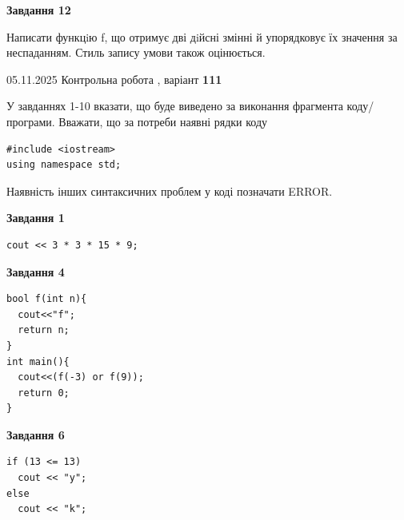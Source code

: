 \documentclass[12pt, ukrainian]{article}
\begin{document}
{\begin {large}
\begin{minipage}[t]{11.0cm}
\begin{center}
\textbf{Завдання 12}
\end{center}

Написати функцiю f, що отримує дві дiйсні змінні й упорядковує їх значення за неспаданням. Стиль запису умови також оцінюється.\par

\end{minipage}

\end {large}}
\newpage

{\Large{05.11.2025 Контрольна робота , варіант  \No \textbf { 111 }\par}}
{
\begin {large}
У завданнях 1-10 вказати, що буде виведено за виконання фрагмента коду/про\-гра\-ми.
Вважати, що за потреби наявні рядки коду
\begin{verbatim}
#include <iostream>
using namespace std;
\end{verbatim}
Наявність інших синтаксичних проблем у коді позначати ERROR.

\begin{minipage}[t]{7.0cm}

\begin{center}
\textbf{Завдання 1}
\end{center}
\vspace{-8mm}

\begin{verbatim}
cout << 3 * 3 * 15 * 9;
\end{verbatim}



\begin{center}
\textbf{Завдання 4}
\end{center}
\vspace{-8mm}

\begin{verbatim}
bool f(int n){
  cout<<"f";
  return n;
}
int main(){
  cout<<(f(-3) or f(9));
  return 0;
}
\end{verbatim}



\begin{center}
\textbf{Завдання 6}
\end{center}
\vspace{-8mm}

\begin{verbatim}
if (13 <= 13)
  cout << "y";
else
  cout << "k";
\end{verbatim}




\end{minipage}
\end{large}}
\end{document}
